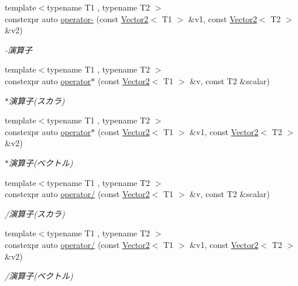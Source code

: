\begin{DoxyCompactItemize}
{\footnotesize template$<$typename T1 , typename T2 $>$ }\\constexpr auto \mbox{\hyperlink{namespacesaki_a4b1f99c0832914f9a23e0672cf9fd0fa}{operator-\/}} (const \mbox{\hyperlink{classsaki_1_1_vector2}{Vector2}}$<$ T1 $>$ \&v1, const \mbox{\hyperlink{classsaki_1_1_vector2}{Vector2}}$<$ T2 $>$ \&v2)
\begin{DoxyCompactList}\small\item\em -\/演算子 \end{DoxyCompactList}\item 
{\footnotesize template$<$typename T1 , typename T2 $>$ }\\constexpr auto \mbox{\hyperlink{namespacesaki_a9b267db283c1b65ccf046a239443f5dd}{operator$\ast$}} (const \mbox{\hyperlink{classsaki_1_1_vector2}{Vector2}}$<$ T1 $>$ \&v, const T2 \&scalar)
\begin{DoxyCompactList}\small\item\em $\ast$演算子(スカラ) \end{DoxyCompactList}\item 
{\footnotesize template$<$typename T1 , typename T2 $>$ }\\constexpr auto \mbox{\hyperlink{namespacesaki_aa99ace9b4d1710c38d180a75514e748f}{operator$\ast$}} (const \mbox{\hyperlink{classsaki_1_1_vector2}{Vector2}}$<$ T1 $>$ \&v1, const \mbox{\hyperlink{classsaki_1_1_vector2}{Vector2}}$<$ T2 $>$ \&v2)
\begin{DoxyCompactList}\small\item\em $\ast$演算子(ベクトル) \end{DoxyCompactList}\item 
{\footnotesize template$<$typename T1 , typename T2 $>$ }\\constexpr auto \mbox{\hyperlink{namespacesaki_a43404fc455816a29474cce93fc5cff50}{operator/}} (const \mbox{\hyperlink{classsaki_1_1_vector2}{Vector2}}$<$ T1 $>$ \&v, const T2 \&scalar)
\begin{DoxyCompactList}\small\item\em /演算子(スカラ) \end{DoxyCompactList}\item 
{\footnotesize template$<$typename T1 , typename T2 $>$ }\\constexpr auto \mbox{\hyperlink{namespacesaki_a6af4b5a4a56add022ed5bfde525d5979}{operator/}} (const \mbox{\hyperlink{classsaki_1_1_vector2}{Vector2}}$<$ T1 $>$ \&v1, const \mbox{\hyperlink{classsaki_1_1_vector2}{Vector2}}$<$ T2 $>$ \&v2)
\begin{DoxyCompactList}\small\item\em /演算子(ベクトル) \end{DoxyCompactList}\item 

\end{DoxyCompactItemize}
